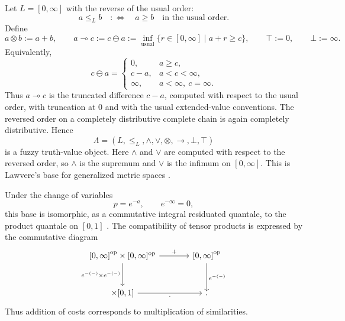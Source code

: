 \begin{example}\label{ex:lawvere-quantale}
    Let \(L=[0,\infty]\) with the reverse of the usual order:
    \[
        a\leq_L b
        \quad:\Longleftrightarrow\quad
        a\geq b
        \quad\text{in the usual order.}
    \]
    Define
    \[
        a\otimes b:=a+b,
        \qquad
        a\multimap c:=c\ominus a
        :=
        \inf_{\mathrm{usual}}\{r\in[0,\infty]\mid a+r\geq c\},
        \qquad
        \top:=0,
        \qquad
        \bot:=\infty.
    \]
    Equivalently,
    \[
        c\ominus a=
        \begin{cases}
            0,&a\geq c,\\
            c-a,&a<c<\infty,\\
            \infty,&a<\infty,\ c=\infty.
        \end{cases}
    \]
    Thus \(a\multimap c\) is the truncated difference \(c-a\), computed with respect to the usual order, with truncation at \(0\) and with the usual extended-value conventions. The reversed order on a completely distributive complete chain is again completely distributive. Hence
    \[
        \Lambda=(L,\leq_L,\wedge,\vee,\otimes,\multimap,\bot,\top)
    \]
    is a fuzzy truth-value object. Here \(\wedge\) and \(\vee\) are computed with respect to the reversed order, so \(\wedge\) is the supremum and \(\vee\) is the infimum on \([0,\infty]\). This is Lawvere's base for generalized metric spaces \cite{Lawvere1973MetricSpaces} \cite[Example~2.3]{stubbe-2014-quantaloid-enriched}.

    Under the change of variables
    \[
        p=e^{-a},
        \qquad
        e^{-\infty}=0,
    \]
    this base is isomorphic, as a commutative integral residuated quantale, to the product quantale on \([0,1]\) \cite[Example~2.4]{stubbe-2014-quantaloid-enriched}. The compatibility of tensor products is expressed by the commutative diagram
    \[
        \begin{tikzcd}[column sep=large,row sep=large]
            \left[0,\infty\right]^{\mathrm{op}}\times [0,\infty]^{\mathrm{op}}
            \arrow[r,"+"]
            \arrow[d,"e^{-(-)}\times e^{-(-)}"']
            &
            \left[0,\infty\right]^{\mathrm{op}}
            \arrow[d,"e^{-(-)}"]
            \\
            [0,1]\times[0,1]
            \arrow[r,"\cdot"']
            &
            [0,1].
        \end{tikzcd}
    \]
    Thus addition of costs corresponds to multiplication of similarities.
\end{example}

